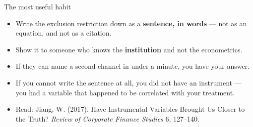 \documentclass[
  11pt,
  ignorenonframetext,
  aspectratio=169,
]{beamer}
\providecommand{\tightlist}{%
  \setlength{\itemsep}{0pt}\setlength{\parskip}{0pt}}
\begin{document}
\begin{frame}{The most useful habit}
\protect{}\label{the-most-useful-habit}
\begin{itemize}
\tightlist
\item
  Write the exclusion restriction down as a \textbf{sentence, in words}
  --- not as an equation, and not as a citation.
\item
  Show it to someone who knows the \textbf{institution} and not the
  econometrics.
\end{itemize}

\vspace{0.4em}

\begin{itemize}
\tightlist
\item
  If they can name a second channel in under a minute, you have your
  answer.
\item
  If you cannot write the sentence at all, you did not have an
  instrument --- you had a variable that happened to be correlated with
  your treatment.
\end{itemize}

\vspace{0.4em}

\begin{itemize}
\tightlist
\item
  Read: Jiang, W. (2017). Have Instrumental Variables Brought Us Closer
  to the Truth? \emph{Review of Corporate Finance Studies} 6, 127--140.
\end{itemize}
\end{frame}
\end{document}
